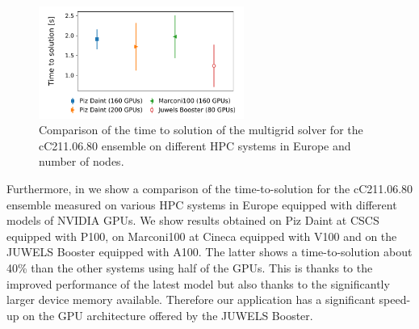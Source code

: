 \begin{figure}
	\includegraphics[width=0.6\textwidth]{plots/comparison.pdf}
	\caption{Comparison of the time to solution of the multigrid solver for the cC211.06.80 ensemble on different HPC systems in Europe and number of nodes.}
	\label{fig:multigrid_comparison}
\end{figure}

Furthermore, in  we show a comparison of the time-to-solution for the cC211.06.80 ensemble measured on various 
HPC systems in Europe equipped with different models of NVIDIA GPUs. We show results obtained on Piz Daint at CSCS equipped with P100, on Marconi100 at Cineca equipped with V100 and on the JUWELS Booster equipped with A100. The latter shows a time-to-solution about 40\% than the other systems using half of the GPUs. This is thanks to the improved performance of the latest model but also thanks to the significantly larger device memory available. Therefore our application has a significant speed-up on the GPU architecture offered by the JUWELS Booster.


\endinput
